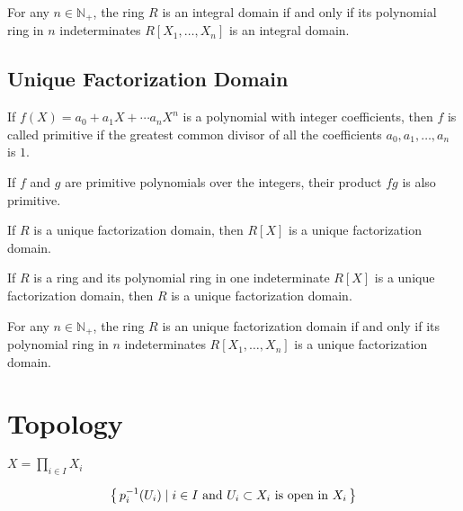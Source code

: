 \begin{corollary}
    For any \(n \in \mathbb{N}_+\), the ring \(R\) is an integral domain if and only if its polynomial ring in \(n\) indeterminates \(R[X_1, \ldots, X_n]\) is an integral domain.
\end{corollary}

\newpage
\chapter{Unique Factorization Domain}

\begin{defbox}
    \begin{definition}
        If \(f(X) = a_0 + a_1 X + \cdots a_n X^n\) is a polynomial with integer coefficients, then \(f\) is called primitive if the greatest common divisor of all the coefficients \(a_0, a_1, \ldots, a_n\) is \(1\).
    \end{definition}
\end{defbox}

\begin{lemma}
    If \(f\) and \(g\) are primitive polynomials over the integers, their product \(fg\) is also primitive.
\end{lemma}

\begin{proposition}
    If \(R\) is a unique factorization domain, then \(R[X]\) is a unique factorization domain.
\end{proposition}

\begin{proposition}
    If \(R\) is a ring and its polynomial ring in one indeterminate \(R[X]\) is a unique factorization domain, then \(R\) is a unique factorization domain.
\end{proposition}

\begin{corollary}
    For any \(n \in \mathbb{N}_+\), the ring \(R\) is an unique factorization domain if and only if its polynomial ring in \(n\) indeterminates \(R[X_1, \ldots, X_n]\) is a unique factorization domain.
\end{corollary}
\part{Topology}

\begin{defbox}
    \begin{definition}
        \label{def:product_topology}
        \(X = \prod_{i \in I} X_i\)

        \begin{align*}
            \left\{\, p_{i}^{-1}(U_i) \mathrel{\mid} i \in I \text{ and } U_i \subset X_i \text{ is open in }X_i \,\right\}
        \end{align*}
    \end{definition}
\end{defbox}